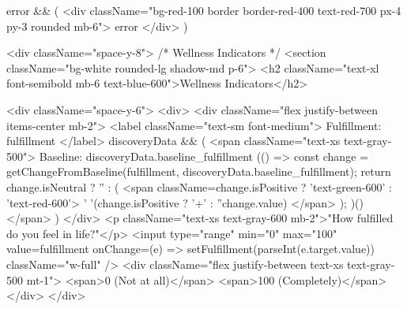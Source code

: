 {      {error && (
        <div className="bg-red-100 border border-red-400 text-red-700 px-4 py-3 rounded mb-6">
          {error}
        </div>
      )}

      <div className="space-y-8">
        {/* Wellness Indicators */}
        <section className="bg-white rounded-lg shadow-md p-6">
          <h2 className="text-xl font-semibold mb-6 text-blue-600">Wellness Indicators</h2>
          
          <div className="space-y-6">
            <div>
              <div className="flex justify-between items-center mb-2">
                <label className="text-sm font-medium">
                  Fulfillment: {fulfillment}
                </label>
                {discoveryData && (
                  <span className="text-xs text-gray-500">
                    Baseline: {discoveryData.baseline_fulfillment}
                    {(() => {
                      const change = getChangeFromBaseline(fulfillment, discoveryData.baseline_fulfillment);
                      return change.isNeutral ? '' : (
                        <span className={change.isPositive ? 'text-green-600' : 'text-red-600'}>
                          {' '}({change.isPositive ? '+' : ''}{change.value})
                        </span>
                      );
                    })()}
                  </span>
                )}
              </div>
              <p className="text-xs text-gray-600 mb-2">"How fulfilled do you feel in life?"</p>
              <input
                type="range"
                min="0"
                max="100"
                value={fulfillment}
                onChange={(e) => setFulfillment(parseInt(e.target.value))}
                className="w-full"
              />
              <div className="flex justify-between text-xs text-gray-500 mt-1">
                <span>0 (Not at all)</span>
                <span>100 (Completely)</span>
              </div>
            </div>

}
